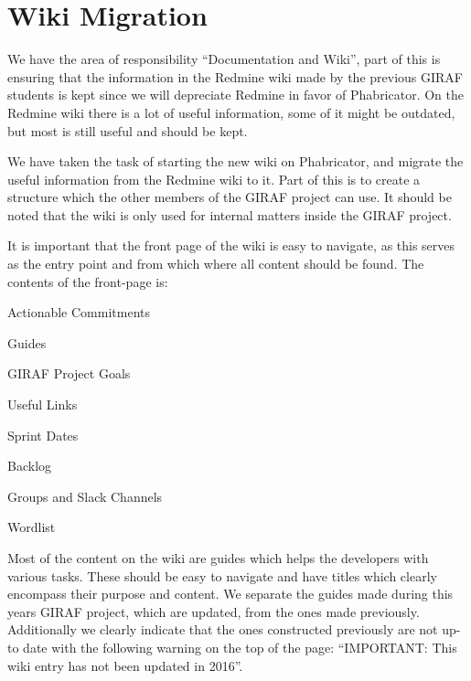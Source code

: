\section{Wiki Migration}
We have the area of responsibility ``Documentation and Wiki'', part of this is ensuring that the information in the Redmine wiki made by the previous GIRAF students is kept since we will depreciate Redmine in favor of Phabricator.
On the Redmine wiki there is a lot of useful information, some of it might be outdated, but most is still useful and should be kept. 

We have taken the task of starting the new wiki on Phabricator, and migrate the useful information from the Redmine wiki to it.
Part of this is to create a structure which the other members of the GIRAF project can use.
It should be noted that the wiki is only used for internal matters inside the GIRAF project.  

It is important that the front page of the wiki is easy to navigate, as this serves as the entry point and from which where all content should be found. 
The contents of the front-page is:

\begin{multicols}{2}
\begin{enumberate}
    \item Actionable Commitments
    \item Guides
    \item GIRAF Project Goals
    \item Useful Links
    \item Sprint Dates
    \item Backlog
    \item Groups and Slack Channels
    \item Wordlist
\end{enumberate}
\end{multicols}

Most of the content on the wiki are guides which helps the developers with various tasks. 
These should be easy to navigate and have titles which clearly encompass their purpose and content. 
We separate the guides made during this years GIRAF project, which are updated, from the ones made previously. 
Additionally we clearly indicate that the ones constructed previously are not up-to date with the following warning on the top of the page: ``IMPORTANT: This wiki entry has not been updated in 2016''. 

